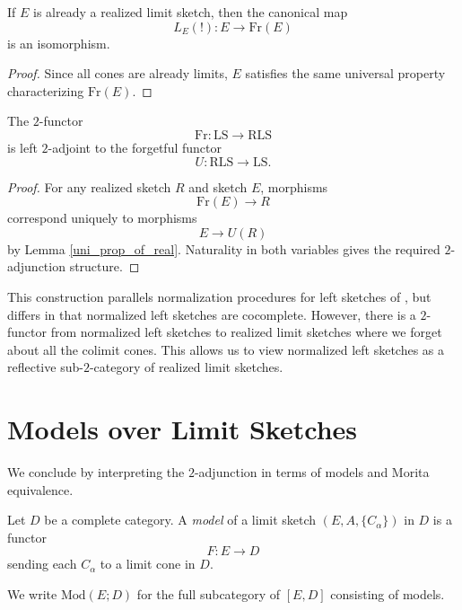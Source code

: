 \documentclass{tac}
\newcommand{\free}{\mathrm{Fr}}
\newcommand{\limsk}{\mathrm{LS}}
\newcommand{\relimsk}{\mathrm{RLS}}
\begin{document}
\begin{lemma}
If $E$ is already a realized limit sketch, then the canonical map
\[
L_E(!) : E \to \free(E)
\]
is an isomorphism.
\end{lemma}

\begin{proof}
Since all cones are already limits, $E$ satisfies the same universal property characterizing $\free(E)$.
\end{proof}

\begin{theorem}
The $2$-functor
\[
\free : \limsk \to \relimsk
\]
is left $2$-adjoint to the forgetful functor
\[
U : \relimsk \to \limsk.
\]
\end{theorem}

\begin{proof}
For any realized sketch $R$ and sketch $E$, morphisms
\[
\free(E) \to R
\]
correspond uniquely to morphisms
\[
E \to U(R)
\]
by Lemma \ref{uni_prop_of_real}. Naturality in both variables gives the required $2$-adjunction structure.
\end{proof}

\begin{remark}
This construction parallels normalization procedures for left sketches of \cite{Lob1}, but differs in that normalized left sketches are cocomplete. However, there is a $2$-functor from normalized left sketches to realized limit sketches where we forget about all the colimit cones. This allows us to view normalized left sketches as a reflective sub-$2$-category of realized limit sketches.
\end{remark}

\section{Models over Limit Sketches}

We conclude by interpreting the $2$-adjunction in terms of models and Morita equivalence.

\begin{definition}
Let $D$ be a complete category. A \emph{model} of a limit sketch $(E,A,\{C_\alpha\})$ in $D$ is a functor
\[
F : E \to D
\]
sending each $C_\alpha$ to a limit cone in $D$.
\end{definition}

\begin{notation}
We write $\mathrm{Mod}(E;D)$ for the full subcategory of $[E,D]$ consisting of models.
\end{notation}
\end{document}
